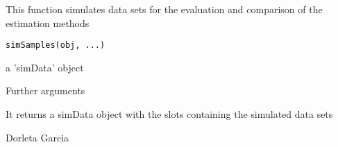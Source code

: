 \begin{Description}\relax
This function simulates data sets for the evaluation and comparison of the estimation methods
\end{Description}
\begin{Usage}
\begin{verbatim}
simSamples(obj, ...)
\end{verbatim}
\end{Usage}
\begin{Arguments}
\begin{ldescription}
\item[\code{obj}] a 'simData' object 
\item[\code{...}] Further arguments 
\end{ldescription}
\end{Arguments}
\begin{Value}
It returns a simData object with the  slots containing the simulated data sets
\end{Value}
\begin{Author}\relax
Dorleta Garcia 
\end{Author}
\begin{SeeAlso}\relax
{}
\end{SeeAlso}

